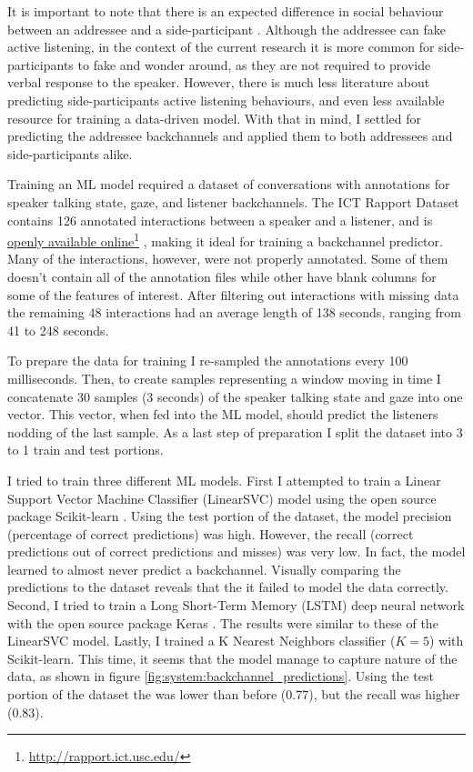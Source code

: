 \documentclass[]{simple-thesis}
\newcommand\fnurl[2]{%
  \href{#2}{#1}\footnote{\url{#2}}%
}
\begin{document}
It is important to note that there is an expected difference in social behaviour between an addressee and a side-participant \citep{Clark1982}.
Although the addressee can fake active listening, in the context of the current research it is more common for side-participants to fake and wonder around, as they are not required to provide verbal response to the speaker.
However, there is much less literature about predicting side-participants active listening behaviours, and even less available resource for training a data-driven model.
With that in mind, I settled for predicting the addressee backchannels and applied them to both addressees and side-participants alike.

Training an ML model required a dataset of conversations with annotations for speaker talking state, gaze, and listener backchannels.
The ICT Rapport Dataset \citep{Gratch2007} contains 126 annotated interactions between a speaker and a listener, and is \fnurl{openly available online}{http://rapport.ict.usc.edu/}, making it ideal for training a backchannel predictor.
Many of the interactions, however, were not properly annotated.
Some of them doesn't contain all of the annotation files while other have blank columns for some of the features of interest.
After filtering out interactions with missing data the remaining 48 interactions had an average length of 138 seconds, ranging from 41 to 248 seconds.

To prepare the data for training I re-sampled the annotations every 100 milliseconds.
Then, to create samples representing a window moving in time I concatenate 30 samples (3 seconds) of the speaker talking state and gaze into one vector.
This vector, when fed into the ML model, should predict the listeners nodding of the last sample.
As a last step of preparation I split the dataset into 3 to 1 train and test portions.

I tried to train three different ML models.
First I attempted to train a Linear Support Vector Machine Classifier (LinearSVC) model using the open source package Scikit-learn \citep{Pedregosa2011}.
Using the test portion of the dataset, the model precision (percentage of correct predictions) was high.
However, the recall (correct predictions out of correct predictions and misses) was very low.
In fact, the model learned to almost never predict a backchannel.
Visually comparing the predictions to the dataset reveals that the it failed to model the data correctly.
Second, I tried to train a Long Short-Term Memory (LSTM) deep neural network with the open source package Keras \citep{Chollet2015}.
The results were similar to these of the LinearSVC model.
Lastly, I trained a K Nearest Neighbors classifier ($K = 5$) with Scikit-learn.
This time, it seems that the model manage to capture nature of the data, as shown in figure \ref{fig:system:backchannel_predictions}.
Using the test portion of the dataset the was lower than before (0.77), but the recall was higher (0.83).
\end{document}
